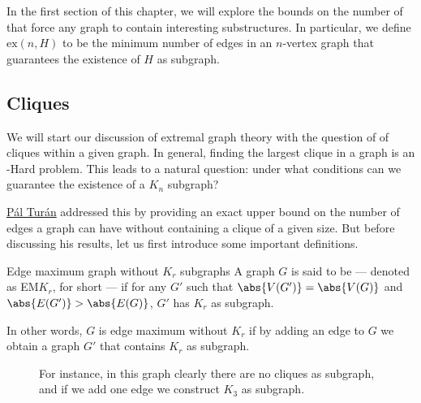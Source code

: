 \documentclass[a4paper, 12pt]{report}
\begin{document}
    In the first section of this chapter, we will explore the bounds on the number of  that force any graph to contain interesting substructures. In particular, we define $\mathrm{ex}(n, H)$ to be the minimum number of edges in an $n$-vertex graph that guarantees the existence of $H$ as subgraph.

    \subsection{Cliques}

    We will start our discussion of extremal graph theory with the question of  of cliques within a given graph. In general, finding the largest clique in a graph is an \NPclass-Hard problem. This leads to a natural question: under what conditions can we guarantee the existence of a $K_n$ subgraph?

    \href{https://en.wikipedia.org/wiki/P%C3%A1l_Tur%C3%A1n}{Pál Turán} addressed this by providing an exact upper bound on the number of edges a graph can have without containing a clique of a given size. But before discussing his results, let us first introduce some important definitions.

    \begin{frameddefn}{Edge maximum graph without $K_r$ subgraphs}
        A graph $G$ is said to be  --- denoted as EM$K_r$, for short --- if for any $G'$ such that $\abs{V(G')} = \abs{V(G)}$ and $\abs{E(G')} > \abs{E(G)}$, $G'$ has $K_r$ as subgraph.
    \end{frameddefn}

    In other words, $G$ is edge maximum without $K_r$ if by adding an edge to $G$ we obtain a graph $G'$ that contains $K_r$ as subgraph.

    \begin{figure}[H]
        \centering
        \caption{For instance, in this graph clearly there are no cliques as subgraph, and if we add one edge we construct $K_3$ as subgraph.}
    \end{figure}
\end{document}

